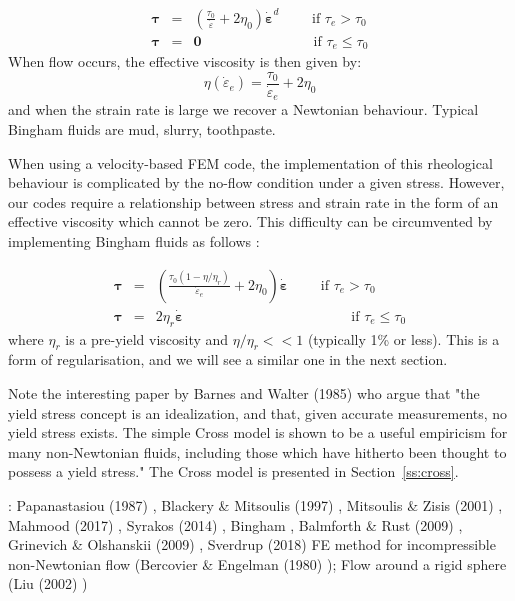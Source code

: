 \begin{eqnarray}
{\bm \tau} &=& \left(  \frac{\tau_0}{\dot{\varepsilon}} + 2 \eta_0  \right)\dot{\bm \varepsilon}^d \qquad 
\text{ if } {\tau}_{e}>\tau_0 \\
{\bm \tau} &=& {\bm 0} \qquad\qquad\qquad\qquad  \text{if } \tau_{e} \leq \tau_0 
\end{eqnarray}
When flow occurs, the effective viscosity is then given by:
\begin{equation}
\eta(\dot{\varepsilon}_e) = \frac{\tau_0}{\dot{\varepsilon}_e} + 2 \eta_0 
\end{equation}
and when the strain rate is large we recover a Newtonian behaviour.
Typical Bingham fluids are mud, slurry, toothpaste.  

When using a velocity-based FEM code, the implementation of this rheological behaviour 
is complicated by the no-flow condition under a given stress. However, our codes
require a relationship between stress and strain rate in the form of an effective viscosity
which cannot be zero. 
This difficulty can be circumvented by implementing Bingham fluids as follows \cite{reddybook2}:

\begin{eqnarray}
{\bm \tau} &=& \left(  \frac{\tau_0(1-\eta/\eta_r)}{\dot{\varepsilon}_e} 
+ 2 \eta_0  \right)\dot{\bm \varepsilon} \qquad \text{ if } \tau_{e}>\tau_0 \\
{\bm \tau} &=& 2 \eta_r \dot{\bm \varepsilon}  \qquad\qquad\qquad\qquad\qquad\qquad  
\text{if } \tau_{e} \leq \tau_0 
\end{eqnarray}
where $\eta_r$ is a pre-yield viscosity and $\eta/\eta_r<<1$ (typically 1\% or less). This is a form of 
regularisation, and we will see a similar one in the next section.

Note the interesting paper by Barnes and Walter (1985) \cite{bawa85} who argue that 
"the yield stress concept is an idealization, and that, given accurate
measurements, no yield stress exists. The simple Cross model is shown to be a
useful empiricism for many non-Newtonian fluids, including those which have
hitherto been thought to possess a yield stress." The Cross model is presented 
in Section~\ref{ss:cross}.
 

\Literature: 
Papanastasiou (1987) \cite{papa87}, Blackery \& Mitsoulis (1997) \cite{blmi97},
Mitsoulis \& Zisis (2001) \cite{mizi01}, Mahmood \etal (2017) \cite{maky17},
Syrakos \etal (2014) \cite{syga14}, Bingham \cite{bingham}, Balmforth \& Rust (2009) \cite{baru09}, 
Grinevich \& Olshanskii (2009) \cite{grol09}, Sverdrup \etal (2018) \cite{svna18}
FE method for incompressible non-Newtonian flow (Bercovier \& Engelman (1980) \cite{been80});
Flow around a rigid sphere (Liu \etal (2002) \cite{limd02})

